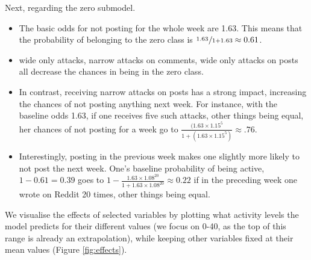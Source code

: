 \documentclass[10pt,]{scrartcl}
\begin{document}
Next, regarding the zero submodel.

\begin{itemize}
\item The basic odds for not posting for the whole week are 1.63. This means that the probability of belonging to the zero class is $\nicefrac{1.63\,}{1+1.63}\approx 0.61$.
\item wide only attacks, narrow attacks on comments, wide only attacks on posts all decrease the chances in being in the zero class.
\item In contrast, receiving narrow attacks on posts has a  strong impact, increasing the chances of not posting anything next week. For instance, with the baseline odds 1.63, if one receives five such attacks, other things being equal, her chances of not posting for a week go to $\frac{(1.63\times 1.15^5 }{1+(1.63\times 1.15^5)}\approx .76$.
\item Interestingly, posting in the previous week makes one slightly more likely to not post the next week. One's baseline probability of being active, $1-0.61 = 0.39$ goes to   $1-\frac{1.63 \times 1.08^20}{1+1.63 \times 1.08^20} \approx 0.22$ if in the preceding week one wrote on \textsf{Reddit} 20 times, other things being equal. 
\end{itemize}

We visualise the effects of selected variables by plotting what activity
levels the model predicts for their different values (we focus on 0-40,
as the top of this range is already an extrapolation), while keeping
other variables fixed at their mean values (Figure \ref{fig:effects}).

\footnotesize

\normalsize
\end{document}
